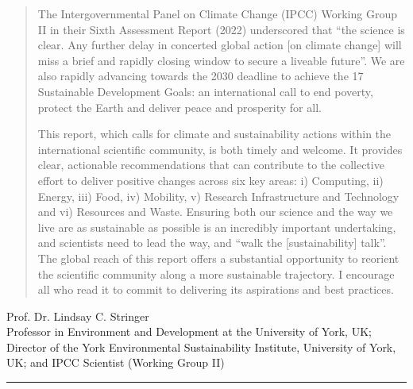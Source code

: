 \documentclass[../SustainableHEP.tex]{subfiles}
\begin{document}
\begin{quotation}
The Intergovernmental Panel on Climate Change (IPCC) Working Group II in their Sixth Assessment Report (2022) underscored that “the science is clear. Any further delay in concerted global action [on climate change] will miss a brief and rapidly closing window to secure a liveable future”. We are also rapidly advancing towards the 2030 deadline to achieve the 17 Sustainable Development Goals: an international call to end poverty, protect the Earth and deliver peace and prosperity for all.

This report, which calls for climate and sustainability actions within the international scientific community, is both timely and welcome. It provides clear, actionable recommendations that can contribute to the collective effort to deliver positive changes across six key areas: i) Computing, ii) Energy, iii) Food, iv) Mobility, v) Research Infrastructure and Technology and vi) Resources and Waste. Ensuring both our science and the way we live are as sustainable as possible is an incredibly important undertaking, and scientists need to lead the way, and “walk the [sustainability] talk”. The global reach of this report offers a substantial opportunity to reorient the scientific community along a more sustainable trajectory. I encourage all who read it to commit to delivering its aspirations and best practices. 
\end{quotation}
\begin{flushleft}
Prof. Dr. Lindsay C. Stringer\\
Professor in Environment and Development at the University of York, UK; Director of the York Environmental Sustainability Institute, University of York, UK; and IPCC Scientist (Working Group II)
\end{flushleft}

\textcolor{Pythongreen}{\rule{2cm}{3pt}}
\end{document}

